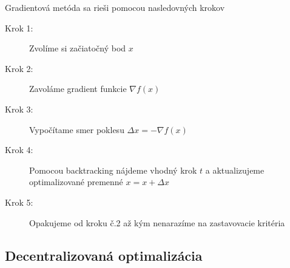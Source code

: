 Gradientová metóda sa rieši pomocou nasledovných krokov
\begin{description}
	\item[Krok 1:] {Zvolíme si začiatočný bod $x$}
	\item[Krok 2:] {Zavoláme gradient funkcie $\nabla f(x)$}
	\item[Krok 3:] {Vypočítame smer poklesu $\Delta x = -\nabla f(x)$}
	\item[Krok 4:] {Pomocou backtracking nájdeme vhodný krok $t$ a aktualizujeme optimalizované premenné $x = x + \Delta x $}
	\item[Krok 5:] {Opakujeme od kroku č.2 až kým nenarazíme na zastavovacie kritéria}
\end{description}


\subsection{Decentralizovaná optimalizácia}